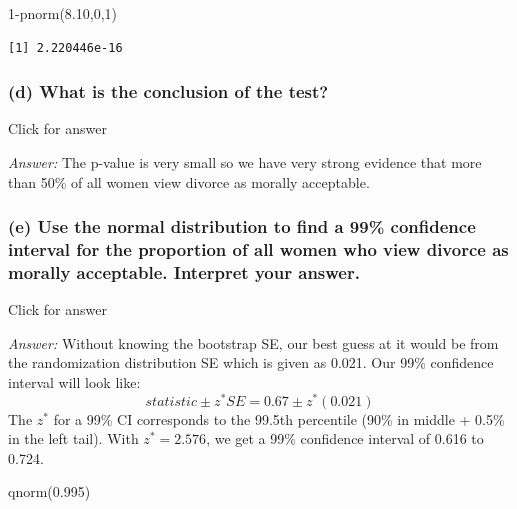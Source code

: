 \documentclass[
]{book}
\newenvironment{Shaded}{\begin{snugshade}}{\end{snugshade}}
\newcommand{\DecValTok}[1]{\textcolor[rgb]{0.00,0.00,0.81}{#1}}
\newcommand{\FloatTok}[1]{\textcolor[rgb]{0.00,0.00,0.81}{#1}}
\newcommand{\FunctionTok}[1]{\textcolor[rgb]{0.00,0.00,0.00}{#1}}
\newcommand{\NormalTok}[1]{#1}
\newcommand{\SpecialCharTok}[1]{\textcolor[rgb]{0.00,0.00,0.00}{#1}}
\begin{document}
\begin{Shaded}
\begin{Highlighting}[]
\DecValTok{1}\SpecialCharTok{{-}}\FunctionTok{pnorm}\NormalTok{(}\FloatTok{8.10}\NormalTok{,}\DecValTok{0}\NormalTok{,}\DecValTok{1}\NormalTok{)}
\end{Highlighting}
\end{Shaded}

\begin{verbatim}
[1] 2.220446e-16
\end{verbatim}

\hypertarget{d-what-is-the-conclusion-of-the-test}{%
\subsubsection{(d) What is the conclusion of the test?}\label{d-what-is-the-conclusion-of-the-test}}

Click for answer

\emph{Answer:} The p-value is very small so we have very strong evidence that more than 50\% of all women view divorce as morally acceptable.

\hypertarget{e-use-the-normal-distribution-to-find-a-99-confidence-interval-for-the-proportion-of-all-women-who-view-divorce-as-morally-acceptable.-interpret-your-answer.}{%
\subsubsection{(e) Use the normal distribution to find a 99\% confidence interval for the proportion of all women who view divorce as morally acceptable. Interpret your answer.}\label{e-use-the-normal-distribution-to-find-a-99-confidence-interval-for-the-proportion-of-all-women-who-view-divorce-as-morally-acceptable.-interpret-your-answer.}}

Click for answer

\emph{Answer:} Without knowing the bootstrap SE, our best guess at it would be from the randomization distribution SE which is given as 0.021. Our 99\% confidence interval will look like:
\[
statistic \pm z^*SE = 0.67 \pm z^* (0.021) 
\]
The \(z^*\) for a 99\% CI corresponds to the 99.5th percentile (90\% in middle + 0.5\% in the left tail). With \(z^* = 2.576\), we get a 99\% confidence interval of 0.616 to 0.724.

\begin{Shaded}
\begin{Highlighting}[]
\FunctionTok{qnorm}\NormalTok{(}\FloatTok{0.995}\NormalTok{)}
\end{Highlighting}
\end{Shaded}
\end{document}

